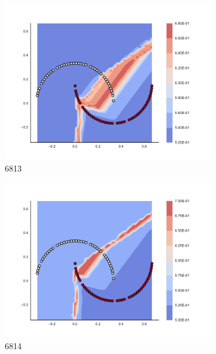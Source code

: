 \begin{figure}[h]
\begin{subfigure}[b]{0.09\textwidth}
    \includegraphics[clip, trim=2.35cm 1.75cm 4.5cm 0cm,width=\textwidth]{img/convergence/6813.pdf}
    \caption{6813}
    \label{fig:convergence_6813}
\end{subfigure}
%
\begin{subfigure}[b]{0.09\textwidth}
    \includegraphics[clip, trim=2.35cm 1.75cm 4.5cm 0cm,width=\textwidth]{img/convergence/6814.pdf}
    \caption{6814}
    \label{fig:convergence_6814}
\end{subfigure}
%
\begin{subfigure}[b]{0.09\textwidth}

\end{subfigure}
\end{figure}
